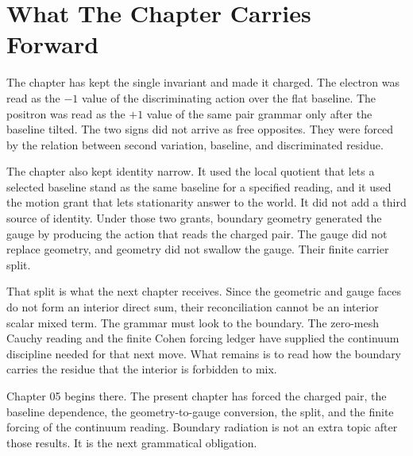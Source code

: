 \section{What The Chapter Carries Forward}

The chapter has kept the single invariant and made it charged. The electron
was read as the \(-1\) value of the discriminating action over the flat
baseline. The positron was read as the \(+1\) value of the same pair grammar
only after the baseline tilted. The two signs did not arrive as free
opposites. They were forced by the relation between second variation,
baseline, and discriminated residue.

The chapter also kept identity narrow. It used the local quotient that lets
a selected baseline stand as the same baseline for a specified reading, and
it used the motion grant that lets stationarity answer to the world. It did
not add a third source of identity. Under those two grants, boundary geometry
generated the gauge by producing the action that reads the charged pair.
The gauge did not replace geometry, and geometry did not swallow the gauge.
Their finite carrier split.

That split is what the next chapter receives. Since the geometric and gauge
faces do not form an interior direct sum, their reconciliation cannot be an
interior scalar mixed term. The grammar must look to the boundary. The
zero-mesh Cauchy reading and the finite Cohen forcing ledger have supplied
the continuum discipline needed for that next move. What remains is to read
how the boundary carries the residue that the interior is forbidden to mix.

Chapter 05 begins there. The present chapter has forced the charged pair,
the baseline dependence, the geometry-to-gauge conversion, the split, and
the finite forcing of the continuum reading. Boundary radiation is not an
extra topic after those results. It is the next grammatical obligation.

